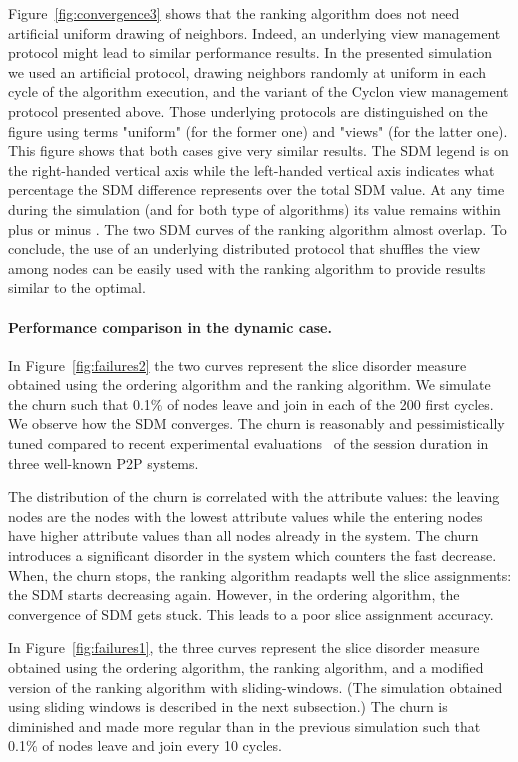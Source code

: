 \documentclass[times,10pt,twocolumn]{article}
\begin{document}
Figure~\ref{fig:convergence3} shows that the ranking algorithm does not need artificial
uniform drawing of neighbors.  Indeed, an underlying view management protocol might 
lead to similar performance results.
In the presented simulation we used an artificial protocol, drawing neighbors
randomly at uniform in each cycle of the algorithm execution, and the variant
of the Cyclon view management protocol presented above. 
Those underlying protocols are distinguished on the figure using terms 
"uniform" (for the former one) and "views" (for the latter one).
This figure shows that both cases give very similar results.  
The SDM legend is on the right-handed vertical axis while
the left-handed vertical axis indicates what percentage the SDM difference
represents over the total SDM value.  At any time during the simulation 
(and for both type of algorithms) its 
value remains within plus or minus .
The two SDM curves of the ranking algorithm almost overlap.  
To conclude, the use of an underlying distributed protocol that shuffles the view among
nodes can be easily used with the ranking algorithm to provide results similar to the optimal.


\paragraph{Performance comparison in the dynamic case.}




In Figure~\ref{fig:failures2} 
the two curves represent the slice disorder measure obtained 
using the ordering algorithm and the ranking algorithm. 
We simulate the churn such that 0.1\% of nodes leave and join 
in each of the 200 first cycles. We observe how the SDM converges. 
The churn is reasonably and pessimistically tuned compared to recent
experimental evaluations~\cite{SR06} of the session duration in three well-known P2P 
systems.

The distribution of the churn is correlated with the attribute values: 
the leaving nodes are the 
nodes with the lowest attribute values while the entering nodes have higher attribute 
values than all nodes already in the system.  
The churn introduces a significant disorder in the system which 
counters the fast decrease.  When, the churn stops, the ranking algorithm readapts 
well the slice assignments: the SDM starts decreasing again.  However, 
in the ordering algorithm, the convergence of SDM gets stuck. 
This leads to a poor slice assignment accuracy.

In Figure~\ref{fig:failures1}, 
the three curves represent the slice disorder measure obtained
using the ordering algorithm, the ranking algorithm, and a modified version of the ranking
algorithm with sliding-windows.
(The simulation obtained using sliding windows is described in the next subsection.)
The churn is diminished and made more regular than in the previous simulation such that
0.1\% of nodes leave and join
every 10 cycles.
\end{document}
